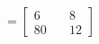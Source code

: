 \documentclass[preview]{standalone}
\begin{document}
\begin{align*}
=\begin{bmatrix} 6 & \quad 8 \\ 80 & \quad 12 \end{bmatrix}
\end{align*}
\end{document}
